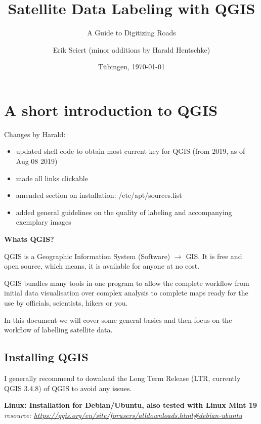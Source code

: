 \documentclass[12pt,a4paper]{scrartcl}
\title{Satellite Data Labeling with QGIS}
\subtitle{A Guide to Digitizing Roads}
\author{Erik Seiert (minor additions by Harald Hentschke)}
\date{Tübingen, \today{}}
\begin{document}
\maketitle
\newpage

\newpage
\tableofcontents
\newpage
 
\section{A short introduction to QGIS}

Changes by Harald:

\begin{itemize}
	\item updated shell code to obtain most current key for QGIS (from 2019, as of Aug 08 2019)
	\item made all links clickable
	\item amended section on installation: /etc/apt/sources.list
	\item added general guidelines on the quality of labeling and accompanying exemplary images
\end{itemize}

\textbf{Whats QGIS?} 


QGIS is a Geographic Information System (Software) $\rightarrow$ GIS. 
It is free and open source, which means, it is available for anyone at no cost.  \newline

QGIS bundles many tools in one program to allow the complete workflow from initial data visualisation over 
complex analysis to complete maps ready for the use by officials, scientists, hikers or you.  

In this document we will cover some general basics and then focus on the workflow of labelling 
satellite data. \newline

\subsection{Installing QGIS}

I generally recommend to download the Long Term Release (LTR, currently QGIS 3.4.8) of QGIS to avoid any issues. \newline

\textbf{Linux: Installation for Debian/Ubuntu, also tested with Linux Mint 19} \newline
\textit{resource: \url{https://qgis.org/en/site/forusers/alldownloads.html\#debian-ubuntu}} \newline 
\end{document}
